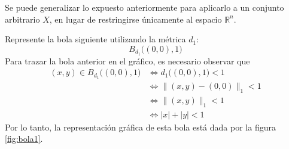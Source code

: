 \begin{observation}
    Se puede generalizar lo expuesto anteriormente para aplicarlo a un conjunto arbitrario $X$, en lugar de restringirse únicamente al espacio $\mathbb{R}^n$.
\end{observation}

\begin{example}
    Represente la bola siguiente utilizando la métrica $d_1$:
    $$B_{d_1} \big( (0, 0), 1 \big)$$
    \solucion Para trazar la bola anterior en el gráfico, es necesario observar que
    \begin{align*}
        (x, y) \in B_{d_1} \big( (0, 0), 1 \big) & \Longleftrightarrow d_1 \big( (0, 0), 1 \big) < 1 \\
        & \Longleftrightarrow \| (x, y) - (0, 0) \|_1 < 1 \\
        & \Longleftrightarrow \| (x, y) \|_1 < 1 \\
        & \Longleftrightarrow |x| + |y| < 1
    \end{align*}
    Por lo tanto, la representación gráfica de esta bola está dada por la figura \ref{fig:bola1}.
\end{example}

